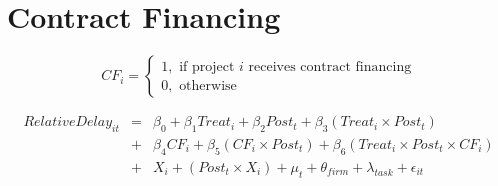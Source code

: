 \documentclass[
]{article}
\begin{document}
\hypertarget{contract-financing}{%
\section{Contract Financing}\label{contract-financing}}

\[ CF_i = \begin{cases} 1, \text{ if project } i \text{ receives contract financing}\\
0, \text{ otherwise} \end{cases}\]

\[ \begin{aligned}
RelativeDelay_{it} &=& \beta_0+\beta_1 Treat_i + \beta_2 Post_t + \beta_3 (Treat_i \times Post_t) \\
&+&\beta_4 CF_i + \beta_5 (CF_i \times Post_t) + \beta_6 (Treat_i \times Post_t \times CF_i) \\ 
&+&X_i + (Post_t \times X_i) + \mu_t + \theta_{firm} + \lambda_{task}+ \epsilon_{it}
\end{aligned}\]
\end{document}

